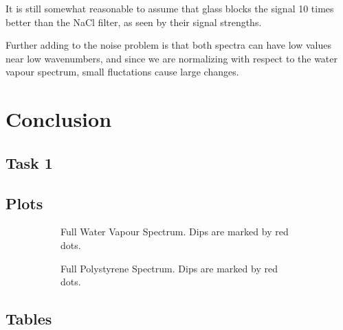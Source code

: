 \documentclass{article}
\begin{document}
It is still somewhat reasonable to assume that glass blocks the signal 10 times better than the NaCl filter, as seen by their signal strengths.

Further adding to the noise problem is that both spectra can have low values near low wavenumbers, and since we are normalizing with respect to the water vapour spectrum, small fluctations cause large changes.

\pagebreak{}

\section{Conclusion}

\pagebreak{}

\begin{appendices}

\section{Task 1}
\label{app:task1}

\subsection{Plots}
\label{app:task1_plots}

\begin{figure}[h]
    \centering
    \begin{subfigure}[t]{0.48\textwidth}
        \centering
        \scalebox{0.5}{}
        \caption{Full Water Vapour Spectrum. Dips are marked by red dots.}
        \label{fig:water_vapour_full}
    \end{subfigure} \hfill
    \begin{subfigure}[t]{0.48\textwidth}
        \centering
        \scalebox{0.5}{}
        \caption{Full Polystyrene Spectrum. Dips are marked by red dots.}
        \label{fig:polystyrene_full}
    \end{subfigure}
	\caption{}
	\label{fig:water_polystyrene_full}
\end{figure}

\subsection{Tables}
\label{app:task1_tables}


\end{appendices}
\end{document}
